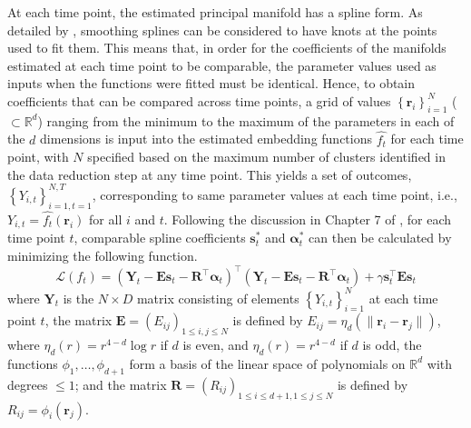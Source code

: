 \documentclass[11pt,reqno]{article}
\newcommand{\T}{\intercal}
\theoremstyle{definition}
\begin{document}
At each time point, the estimated principal manifold has a spline form. As detailed by \cite{greenSilverman1994}, smoothing splines can be considered to have knots at the points used to fit them. This means that, in order for the coefficients of the manifolds estimated at each time point to be comparable, the parameter values used as inputs when the functions were fitted must be identical. Hence, to obtain coefficients that can be compared across time points, a grid of values $\left\{\boldsymbol{r}_i\right\}_{i=1}^{N}$ ($\subset\mathbb{R}^d$) ranging from the minimum to the maximum of the parameters in each of the $d$ dimensions is input into the estimated embedding functions $\widehat{f_t}$ for each time point, with $N$ specified based on the maximum number of clusters identified in the data reduction step at any time point. This yields a set of outcomes, $\left\{Y_{i,t}\right\}_{i=1, t = 1}^{N, T}$, corresponding to same parameter values at each time point, i.e., $Y_{i,t}=\widehat{f_t}(\boldsymbol{r}_i)$ for all $i$ and $t$. Following the discussion in Chapter 7 of \cite{greenSilverman1994}, for each time point $t$, comparable spline coefficients $\boldsymbol{s}_t^*$ and $\boldsymbol{\alpha}_t^*$ can then be calculated by minimizing the following function.
\begin{equation}\label{eq:splineL}
    \mathcal{L}(f_t) = (\boldsymbol{Y}_t - \boldsymbol{E}\boldsymbol{s}_t - \boldsymbol{R}^\T\boldsymbol{\alpha}_t)^\T(\boldsymbol{Y}_t - \boldsymbol{E}\boldsymbol{s}_t - \boldsymbol{R}^\T\boldsymbol{\alpha}_t) + \gamma\boldsymbol{s}_t^\T \boldsymbol{E}\boldsymbol{s}_t
\end{equation}
where $\boldsymbol{Y}_t$ is the $N \times D$ matrix consisting of elements $\left\{Y_{i,t}\right\}_{i=1}^{N}$ at each time point $t$, the matrix $\boldsymbol{E}=(E_{ij})_{1\le i,j\le N}$ is defined by $E_{ij} = \eta_{d}(\|\boldsymbol{r}_i - \boldsymbol{r}_j\|)$, where $\eta_{d}(r) = r^{4 - d}\log r$ if $d$ is even, and $\eta_d(r) = r^{4-d}$ if $d$ is odd, the functions $\phi_1,\ldots,\phi_{d+1}$ form a basis of the linear space of polynomials on $\mathbb{R}^d$ with degrees $\le1$; and the matrix $\boldsymbol{R}=(R_{ij})_{1\le i\le d+1,1\le j\le N}$ is defined by $R_{ij} = \phi_i(\boldsymbol{r}_j)$.
\end{document}
